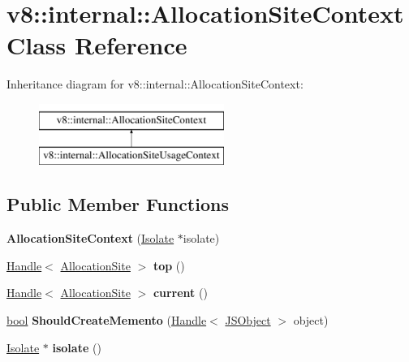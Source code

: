 \hypertarget{classv8_1_1internal_1_1AllocationSiteContext}{}\section{v8\+:\+:internal\+:\+:Allocation\+Site\+Context Class Reference}
\label{classv8_1_1internal_1_1AllocationSiteContext}
Inheritance diagram for v8\+:\+:internal\+:\+:Allocation\+Site\+Context\+:\begin{figure}[H]
\begin{center}
\leavevmode
\includegraphics[height=2.000000cm]{classv8_1_1internal_1_1AllocationSiteContext}
\end{center}
\end{figure}
\subsection*{Public Member Functions}
\begin{DoxyCompactItemize}
\item 
\mbox{\label{classv8_1_1internal_1_1AllocationSiteContext_acad3aa6b62e34d542b6fd6c9b87e2093}} 
{\bfseries Allocation\+Site\+Context} (\mbox{\hyperlink{classv8_1_1internal_1_1Isolate}{Isolate}} $\ast$isolate)
\item 
\mbox{\label{classv8_1_1internal_1_1AllocationSiteContext_a76427a09d8c0eef6794ecfd804ca8eea}} 
\mbox{\hyperlink{classv8_1_1internal_1_1Handle}{Handle}}$<$ \mbox{\hyperlink{classv8_1_1internal_1_1AllocationSite}{Allocation\+Site}} $>$ {\bfseries top} ()
\item 
\mbox{\label{classv8_1_1internal_1_1AllocationSiteContext_a20943342b9c850bc0f1c3fd0aef56e9a}} 
\mbox{\hyperlink{classv8_1_1internal_1_1Handle}{Handle}}$<$ \mbox{\hyperlink{classv8_1_1internal_1_1AllocationSite}{Allocation\+Site}} $>$ {\bfseries current} ()
\item 
\mbox{\label{classv8_1_1internal_1_1AllocationSiteContext_adfa2a2817414d94fd00728a2c163d7b0}} 
\mbox{\hyperlink{classbool}{bool}} {\bfseries Should\+Create\+Memento} (\mbox{\hyperlink{classv8_1_1internal_1_1Handle}{Handle}}$<$ \mbox{\hyperlink{classv8_1_1internal_1_1JSObject}{J\+S\+Object}} $>$ object)
\item 
\mbox{\label{classv8_1_1internal_1_1AllocationSiteContext_a8adcb0b60cf5fbda807b0a11c128ab4a}} 
\mbox{\hyperlink{classv8_1_1internal_1_1Isolate}{Isolate}} $\ast$ {\bfseries isolate} ()
\end{DoxyCompactItemize}
